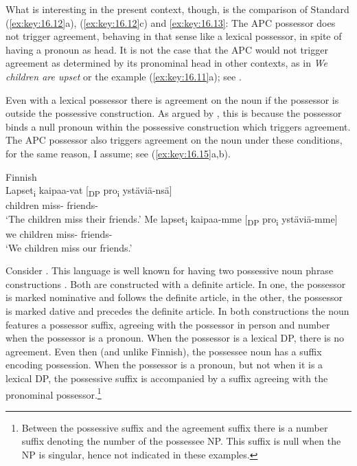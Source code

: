 \documentclass[output=paper]{langsci/langscibook}
\begin{document}
What is interesting in the present context, though, is the comparison of
Standard  (\ref{ex:key:16.12}a), (\ref{ex:key:16.12}c) and \eqref{ex:key:16.13}: The \gls{APC} possessor does not
trigger agreement, behaving in that sense like a lexical possessor, in spite of
having a pronoun as head. It is not the case that the \gls{APC} would not
trigger agreement as determined by its pronominal head in other contexts, as in
\emph{We children are upset} or the  example
(\ref{ex:key:16.11}a); see \citet{Hoehn2017}.

Even with a lexical possessor there is agreement on the noun if the possessor
is outside the possessive construction. As argued by
\citet{BratticoHuhmarniemi2015}, this is because the possessor binds a null
pronoun within the possessive construction which triggers agreement. The
\gls{APC} possessor also triggers agreement
on the noun under these conditions, for the same reason, I assume; see (\ref{ex:key:16.15}a,b).

\ea Finnish\\\label{ex:key:16.15}
	\ea
		\gll Lapset\textsubscript{i}  kaipaa-vat [\textsubscript{DP} pro\textsubscript{i} ystäviä-nsä]\\
			children miss-\Tpl{} {} {} friends-\Tpl{}\\
		\glt    `The children miss their friends.'
	\ex
		\gll Me lapset\textsubscript{i}  kaipaa-mme [\textsubscript{DP} pro\textsubscript{i} ystäviä-mme]\\
			we children miss-\Fpl{} {} {} friends-\Fpl{}\\
		\glt    `We children miss our friends.'
	\z
\z

Consider . This language is well known for having two possessive noun
phrase constructions \parencite{Szabolcsi1983,Szabolcsi1994}. Both are
constructed with a definite article. In one, the possessor is marked
nominative and follows the definite article, in the other,
the possessor is marked dative and precedes the definite article. In both
constructions the noun features a possessor suffix, agreeing with the possessor
in person and number when the possessor is a pronoun. When the possessor is a
lexical DP, there is no agreement. Even then (and unlike Finnish), the
possessee noun has a suffix encoding possession. When the possessor is a
pronoun, but not when it is a lexical DP, the possessive suffix is accompanied
by a suffix agreeing with the pronominal possessor.\footnote{Between the
possessive suffix and the agreement suffix there is a number suffix denoting
the number of the possessee NP. This suffix is null when the NP is singular,
hence not indicated in these examples.}
\end{document}

